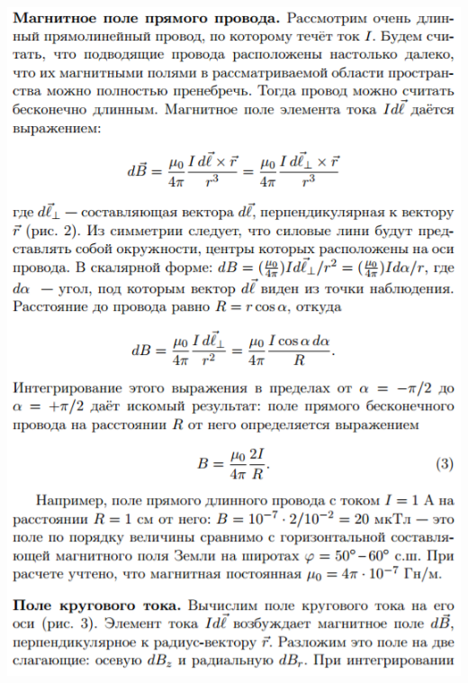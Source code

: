 \documentclass[12pt]{article}
\begin{document}
\begin{center}
       	\includegraphics[width=15cm]{theory3.png}

\end{center}
\end{document}
